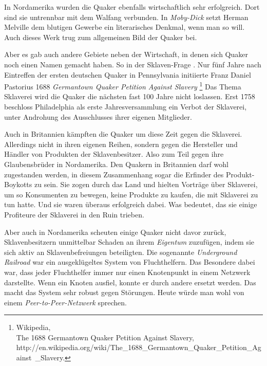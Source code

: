 \medskip

In Nordamerika wurden die Quaker ebenfalls wirtschaftlich sehr erfolgreich. Dort
sind sie untrennbar mit dem Walfang  verbunden. In
\textit{Moby-Dick} setzt
Herman Melville  dem blutigen Gewerbe ein
literarisches Denkmal, wenn man so
will. Auch dieses Werk trug zum allgemeinen Bild der Quaker bei.

\medskip

Aber es gab auch andere Gebiete neben der Wirtschaft, in denen sich Quaker noch
einen
Namen gemacht haben. So in der Sklaven-Frage . Nur fünf Jahre
nach Eintreffen
der ersten deutschen Quaker in Pennsylvania initiierte Franz Daniel Pastorius
1688 \textit{Germantown Quaker Petition Against Slavery}
\footnote{Wikipedia,
\\The 1688 Germantown Quaker Petition Against Slavery,
\\http://en.wikipedia.org/wiki/The\_1688\_Germantown\_Quaker\_Petition\_Against\
\_Slavery.} Das Thema Sklaverei wird die Quaker die nächsten fast 100 Jahre
nicht
loslassen. Erst 1758 beschloss Philadelphia  als erste
Jahresversammlung ein Verbot der Sklaverei,
unter Androhung des Ausschlusses ihrer eigenen Mitglieder.

\medskip

Auch in Britannien kämpften die Quaker um diese Zeit gegen die Sklaverei.
Allerdings nicht in ihren eigenen Reihen, sondern gegen die Hersteller
und Händler von Produkten der Sklavenbesitzer. Also zum Teil gegen ihre
Glaubensbrüder in Nordamerika. Den Quakern in Britannien darf wohl zugestanden
werden, in diesem Zusammenhang sogar die Erfinder des Produkt-Boykotts
\index{Boykott} zu sein.
Sie zogen durch das Land und hielten Vorträge über Sklaverei, um so Konsumenten
zu
bewegen, keine Produkte zu kaufen, die mit Sklaverei zu tun hatte. Und sie
waren überaus erfolgreich dabei. Was bedeutet, das sie einige Profiteure der
Sklaverei in den Ruin trieben.

\medskip

Aber auch in Nordamerika  scheuten einige Quaker nicht
davor zurück,
Sklavenbesitzern unmittelbar Schaden an ihrem \textit{Eigentum} zuzufügen, indem
sie sich 
aktiv an Sklavenbefreiungen beteiligten. Die sogenannte
\textit{Underground Railroad}  war ein
ausgeklügeltes System von Fluchthelfern. Das
Besondere dabei war, dass jeder Fluchthelfer 
immer
nur einen Knotenpunkt in einem
Netzwerk darstellte. Wenn ein Knoten ausfiel, konnte er durch andere ersetzt
werden. Das macht das System sehr robust gegen Störungen. Heute würde man
wohl
von einem \textit{Peer-to-Peer-Netzwerk} sprechen.

